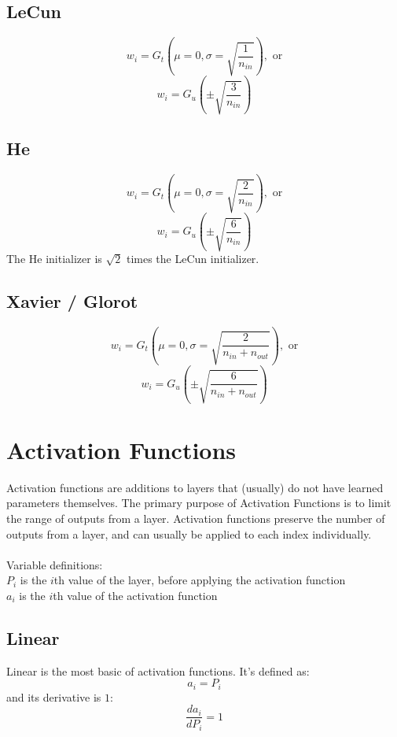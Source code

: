 \documentclass[fleqn]{article}
\begin{document}
\subsection{LeCun}
\[ w_i = G_t(\mu=0, \sigma=\sqrt{\frac{1}{n_{in}}}), \text{ or} \]
\[ w_i = G_u(\pm \sqrt{\frac{3}{n_{in}}}) \]

\subsection{He}
\[ w_i = G_t(\mu=0, \sigma=\sqrt{\frac{2}{n_{in}}}), \text{ or}\]
\[ w_i = G_u(\pm \sqrt{\frac{6}{n_{in}}}) \]
The He initializer is $\sqrt{2}$ times the LeCun
initializer.

\subsection{Xavier / Glorot}
\[ w_i = G_t(\mu=0, \sigma=\sqrt{\frac{2}{n_{in} + n_{out}}}), \text{ or} \]
\[ w_i = G_u(\pm \sqrt{\frac{6}{n_{in} + n_{out}}}) \]


\section{Activation Functions}
Activation functions are additions to layers that (usually) do not have
learned parameters themselves. The primary purpose of Activation Functions
is to limit the range of outputs from a layer. Activation functions
preserve the number of outputs from a layer, and can usually be applied
to each index individually.
\\ \\
Variable definitions:\\
\hspace*{6mm} $P_i$ is the $i$th value of the layer, before applying the
activation function\\
\hspace*{6mm} $a_i$ is the $i$th value of the activation function

\subsection{Linear}
Linear is the most basic of activation functions. It's defined as:
\[ a_i = P_i \]
and its derivative is $1$:
\[ \frac{d a_i}{d P_i} = 1 \]
\end{document}
